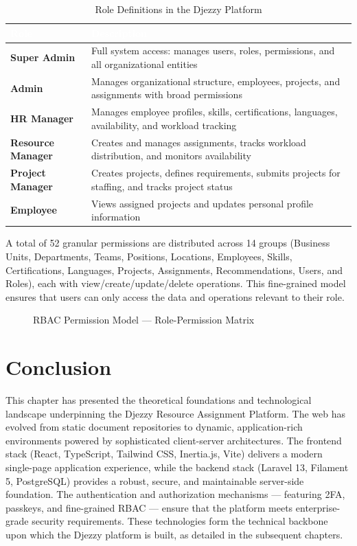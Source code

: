 \documentclass{bts-report}
\begin{document}
\begin{table}[H]
  \centering
  \caption{Role Definitions in the Djezzy Platform}
  \vspace{0.2cm}
  \begin{tabularx}{\textwidth}{|>{\bfseries}p{3.5cm}|X|}
    \hline
    \rowcolor{tableheader}
    \textcolor{white}{\textbf{Role}} & \textcolor{white}{\textbf{Description}} \\
    \hline
    Super Admin & Full system access: manages users, roles, permissions, and all organizational entities \\
    \hline
    Admin & Manages organizational structure, employees, projects, and assignments with broad permissions \\
    \hline
    HR Manager & Manages employee profiles, skills, certifications, languages, availability, and workload tracking \\
    \hline
    Resource Manager & Creates and manages assignments, tracks workload distribution, and monitors availability \\
    \hline
    Project Manager & Creates projects, defines requirements, submits projects for staffing, and tracks project status \\
    \hline
    Employee & Views assigned projects and updates personal profile information \\
    \hline
  \end{tabularx}
\end{table}

A total of 52 granular permissions are distributed across 14 groups (Business Units, Departments, Teams, Positions, Locations, Employees, Skills, Certifications, Languages, Projects, Assignments, Recommendations, Users, and Roles), each with view/create/update/delete operations. This fine-grained model ensures that users can only access the data and operations relevant to their role.

\begin{figure}[htbp]
  \centering
  \resizebox{0.95\textwidth}{!}{}
  \caption{RBAC Permission Model --- Role-Permission Matrix}
  \label{fig:rbac}
\end{figure}

\section*{Conclusion}
This chapter has presented the theoretical foundations and technological landscape underpinning the Djezzy Resource Assignment Platform. The web has evolved from static document repositories to dynamic, application-rich environments powered by sophisticated client-server architectures. The frontend stack (React, TypeScript, Tailwind CSS, Inertia.js, Vite) delivers a modern single-page application experience, while the backend stack (Laravel 13, Filament 5, PostgreSQL) provides a robust, secure, and maintainable server-side foundation. The authentication and authorization mechanisms --- featuring 2FA, passkeys, and fine-grained RBAC --- ensure that the platform meets enterprise-grade security requirements. These technologies form the technical backbone upon which the Djezzy platform is built, as detailed in the subsequent chapters.
\end{document}
